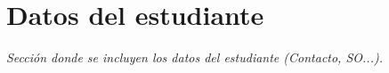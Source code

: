 \section*{Datos del estudiante}

\textit{Sección donde se incluyen los datos del estudiante (Contacto, SO...).}
